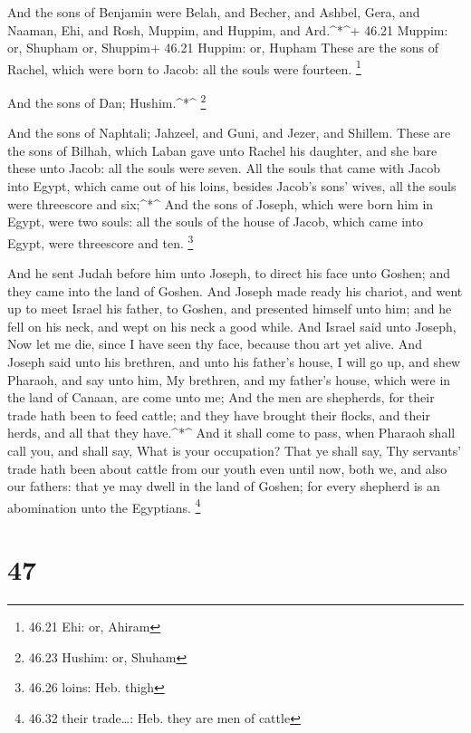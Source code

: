  And the sons of Benjamin were Belah, and Becher, and
Ashbel, Gera, and Naaman, Ehi, and Rosh, Muppim, and Huppim, and
Ard.\^{}*\^{}+ 46.21 Muppim: or, Shupham or, Shuppim+ 46.21 Huppim: or,
Hupham  These are the sons of Rachel, which were born to
Jacob: all the souls were fourteen. \footnote{46.21 Ehi: or, Ahiram}

 And the sons of Dan; Hushim.\^{}*\^{} \footnote{46.23
  Hushim: or, Shuham}

 And the sons of Naphtali; Jahzeel, and Guni, and Jezer,
and Shillem.  These are the sons of Bilhah, which Laban
gave unto Rachel his daughter, and she bare these unto Jacob: all the
souls were seven.  All the souls that came with Jacob into
Egypt, which came out of his loins, besides Jacob's sons' wives, all the
souls were threescore and six;\^{}*\^{}  And the sons of
Joseph, which were born him in Egypt, were two souls: all the souls of
the house of Jacob, which came into Egypt, were threescore and ten.
\footnote{46.26 loins: Heb. thigh}

 And he sent Judah before him unto Joseph, to direct his
face unto Goshen; and they came into the land of Goshen. 
And Joseph made ready his chariot, and went up to meet Israel his
father, to Goshen, and presented himself unto him; and he fell on his
neck, and wept on his neck a good while.  And Israel said
unto Joseph, Now let me die, since I have seen thy face, because thou
art yet alive.  And Joseph said unto his brethren, and unto
his father's house, I will go up, and shew Pharaoh, and say unto him, My
brethren, and my father's house, which were in the land of Canaan, are
come unto me;  And the men are shepherds, for their trade
hath been to feed cattle; and they have brought their flocks, and their
herds, and all that they have.\^{}*\^{}  And it shall come
to pass, when Pharaoh shall call you, and shall say, What is your
occupation?  That ye shall say, Thy servants' trade hath
been about cattle from our youth even until now, both we, and also our
fathers: that ye may dwell in the land of Goshen; for every shepherd is
an abomination unto the Egyptians. \footnote{46.32 their trade\ldots:
  Heb. they are men of cattle}

\hypertarget{section-46}{%
\section{47}\label{section-46}}

